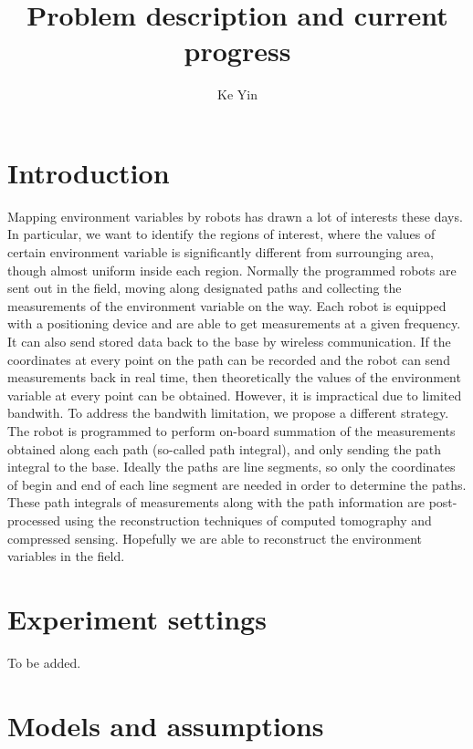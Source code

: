\documentclass[english]{article}\usepackage[]{graphicx}\usepackage[]{color}
\begin{document}
\title{Problem description and current progress}

\author{Ke Yin}

\maketitle

\section{Introduction}

Mapping environment variables by robots has drawn a lot of interests
these days. In particular, we want to identify the regions of interest,
where the values of certain environment variable is significantly
different from surrounging area, though almost uniform inside each
region. Normally the programmed robots are sent out in the field,
moving along designated paths and collecting the measurements of the
environment variable on the way. Each robot is equipped with a positioning
device and are able to get measurements at a given frequency. It can
also send stored data back to the base by wireless communication.
If the coordinates at every point on the path can be recorded and
the robot can send measurements back in real time, then theoretically
the values of the environment variable at every point can be obtained.
However, it is impractical due to limited bandwith. To address the
bandwith limitation, we propose a different strategy. The robot is
programmed to perform on-board summation of the measurements obtained
along each path (so-called path integral), and only sending the path
integral to the base. Ideally the paths are line segments, so only
the coordinates of begin and end of each line segment are needed in
order to determine the paths. These path integrals of measurements
along with the path information are post-processed using the reconstruction
techniques of computed tomography and compressed sensing. Hopefully
we are able to reconstruct the environment variables in the field.


\section{Experiment settings}

To be added.


\section{Models and assumptions}
\end{document}
